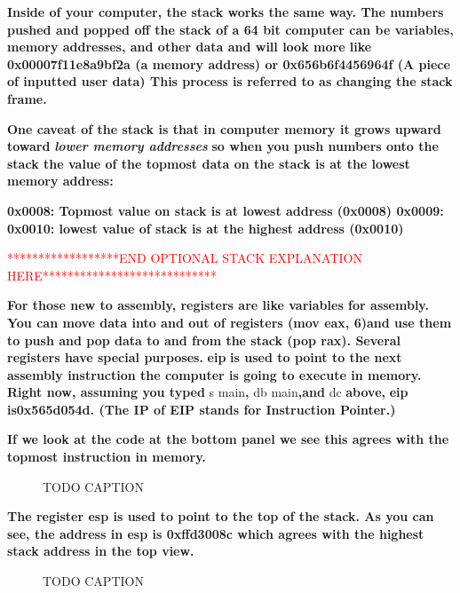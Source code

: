 \documentclass[letterpaper]{article}
\newcommand{\sitfig}[3]{
\begin{figure}[H]
\centering
\makebox[\textwidth][c]{
#2
}
\caption{#3}
\label{#1}
\end{figure}
}
\newcommand{\sitgfx}[4][scale=1.0]{
\sitfig{#3}{\texttt{[image: \#2]}}{#4}
}
\begin{document}
\textbf{Inside of your computer, the stack works the same way. The numbers pushed and popped off the stack of a 64 bit
computer can be variables, memory addresses, and other data and will look more like 0x00007f11e8a9bf2a (a memory
address) or 0x656b6f4456964f (A piece of inputted user data) This process is referred to as changing the stack frame.}

\textbf{One caveat of the stack is that in computer memory it grows upward toward }\textbf{\textit{lower memory
addresses}}\textbf{ so when you push numbers onto the stack the value of the topmost data on the stack is at the lowest
memory address:}

\textbf{0x0008: Topmost value on stack is at lowest address (0x0008)\newline
0x0009:\newline
0x0010: lowest value of stack is at the highest address (0x0010)}

\textcolor{red}{******************END OPTIONAL STACK EXPLANATION HERE****************************}

\textbf{For those new to assembly, registers are like variables for assembly. You can move data into and out of
registers (mov eax, 6)and use them to push and pop data to and from the stack (pop rax). Several registers have special
purposes. }\textbf{\textcolor[rgb]{0.21960784,0.4627451,0.11372549}{eip}}\textbf{ is used to point to the next assembly
instruction the computer is going to execute in memory. Right now, assuming you typed }s main\textbf{, }db
main\textbf{,and }dc\textbf{ above, }\textbf{\textcolor[rgb]{0.21960784,0.4627451,0.11372549}{eip}}\textbf{
is0x565d054d.}\textbf{\textcolor{red}{ }}\textbf{(The IP of EIP stands for Instruction Pointer.)}

\textbf{\textcolor{red}{ }}\textbf{If we look at the code at the bottom panel we see this agrees with the topmost
instruction in memory.}

  
\sitgfx[width=6.5in,height=5.6665in]{FINALWORKINGDOCFORMERLYPRECURSOR-img028.png}{fig:unk}{TODO CAPTION}
 

\textbf{The register esp is used to point to the top of the stack. As you can see, the address in esp is 0xffd3008c
which agrees with the highest stack address in the top view.}

  
\sitgfx[width=6.5in,height=5.1252in]{FINALWORKINGDOCFORMERLYPRECURSOR-img029.png}{fig:unk}{TODO CAPTION}
 
\end{document}
